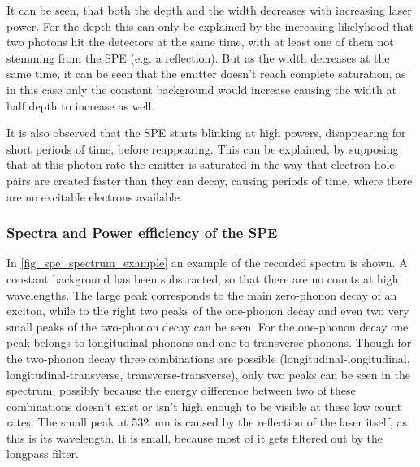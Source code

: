 It can be seen, that both the depth and the width decreases with increasing laser power.
For the depth this can only be explained by the increasing likelyhood that two photons hit the detectors at the same time, with at least one of them not stemming from the SPE (e.g. a reflection).
But as the width decreases at the same time, it can be seen that the emitter doesn't reach complete saturation, as in this case only the constant background would increase causing the width at half depth to increase as well.

It is also observed that the SPE starts blinking at high powers, disappearing for short periods of time, before reappearing.
This can be explained, by supposing that at this photon rate the emitter is saturated in the way that electron-hole pairs are created faster than they can decay, causing periods of time, where there are no excitable electrons available. %

\subsubsection{Spectra and Power efficiency of the SPE}

In \cref{fig_spe_spectrum_example} an example of the recorded spectra is shown.
A constant background has been substracted, so that there are no counts at high wavelengths.
The large peak corresponds to the main zero-phonon decay of an exciton, while to the right two peaks of the one-phonon decay and even two very small peaks of the two-phonon decay can be seen.
For the one-phonon decay one peak belongs to longitudinal phonons and one to transverse phonons.
Though for the two-phonon decay three combinations are possible (longitudinal-longitudinal, longitudinal-transverse, transverse-transverse), only two peaks can be seen in the spectrum, possibly because the energy difference between two of these combinations doesn't exist or isn't high enough to be visible at these low count rates.
The small peak at \SI{532}{nm} is caused by the reflection of the laser itself, as this is its wavelength.
It is small, because most of it gets filtered out by the longpass filter.

